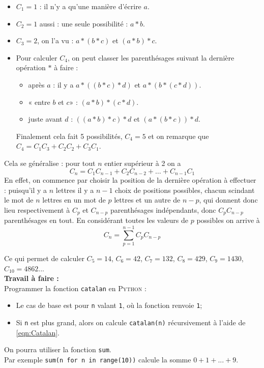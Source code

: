 \documentclass[10pt,firamath,cours]{nsi}
\begin{document}
\begin{exercice}
	\begin{itemize}
		\item 	$C_1=1$ : il n'y a qu'une manière d'écrire $a$.
		\item 	$C_2=1$ aussi : une seule possibilité : $a*b$.
		\item 	$C_3=2$, on l'a vu : $a*(b*c)$ et $(a*b)*c$.
		\item 	Pour calculer $C_4$, on peut classer les parenthésages suivant la dernière opération $*$ à faire :
		      \begin{itemize}
			      \item 	après $a$ : il y a $a*((b*c)*d)$ et $a*(b*(c*d))$.
			      \item 	« entre $b$ et $c$» : $(a*b)*(c*d)$.
			      \item 	juste avant $d$ : $((a*b)*c)*d$ et $(a*(b*c))*d$.
		      \end{itemize}
		      Finalement cela fait 5 possibilités, $C_4=5$ et on remarque que $C_4=C_1C_3+C_2C_2+C_3C_1$.
	\end{itemize}
	Cela se généralise : pour tout $n$ entier supérieur à 2 on a
	$$C_n=C_1C_{n-1}+C_2C_{n-2}+\ldots+C_{n-1}C_1$$
	En effet, on commence par choisir la position de la dernière opération à effectuer : puisqu'il y a $n$ lettres il y a $n-1$ choix de positions
	possibles, chacun scindant le mot de $n$ lettres en un mot de $p$ lettres et un autre de $n-p$, qui donnent donc lieu respectivement à $C_p$ et
	$C_{n-p}$ parenthésages indépendants, donc $C_pC_{n-p}$ parenthésages en tout. En considérant toutes les valeurs de $p$ possibles on arrive à
	\begin{equation}
		\tag{*}
		C_n=\sum_{p=1}^{n-1}C_pC_{n-p}
		\label{eqn:Catalan}
	\end{equation}
	
	Ce qui permet de calculer $C_5 =14$, $C_6 =42$, $C_7 =132$, $C_8 =429$, $C_9 =1430$, $C_{10} =4862$...\\
	
	\textbf{Travail à faire :}\\
	
	Programmer la fonction \texttt{catalan} en \textsc{Python} :
	\begin{itemize}
		\item 	Le cas de base est pour \texttt{n} valant \texttt{1}, où la fonction renvoie \texttt{1};
		\item 	Si \texttt{n} est plus grand, alors on calcule \texttt{catalan(n)} récursivement à l'aide de \eqref{eqn:Catalan}.
	\end{itemize}
	
	On pourra utiliser la fonction \texttt{sum}.\\
	Par exemple \texttt{sum(n for n in range(10))} calcule la somme $0+1+...+9$.
\end{exercice}
\end{document}
